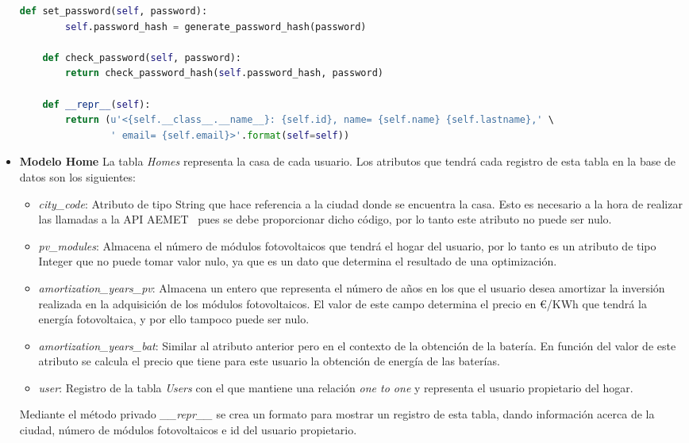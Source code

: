 \begin{itemize}
\begin{lstlisting}[language=Python,float=ht,caption={Modelo \textit{User}},label={lst:modelUser}]
    def set_password(self, password):
        self.password_hash = generate_password_hash(password)

    def check_password(self, password):
        return check_password_hash(self.password_hash, password)

    def __repr__(self):
        return (u'<{self.__class__.__name__}: {self.id}, name= {self.name} {self.lastname},' \
                ' email= {self.email}>'.format(self=self))
\end{lstlisting}
\item \textbf{Modelo Home}
La tabla \textit{Homes} representa la casa de cada usuario. Los atributos que tendrá cada registro de esta tabla en la base de datos son los siguientes:
\begin{itemize}
\item \textit{city\_code}: Atributo de tipo String que hace referencia a la ciudad donde se encuentra la casa. Esto es necesario a la hora de realizar las llamadas a la API AEMET~\cite{Aemet} pues se debe proporcionar dicho código, por lo tanto este atributo no puede ser nulo.
\item \textit{pv\_modules}: Almacena el número de módulos fotovoltaicos que tendrá el hogar del usuario, por lo tanto es un atributo de tipo Integer que no puede tomar valor nulo, ya que es un dato que determina el resultado de una optimización.
\item \textit{amortization\_years\_pv}: Almacena un entero que representa el número de años en los que el usuario desea amortizar la inversión realizada en la adquisición de los módulos fotovoltaicos. El valor de este campo determina el precio en €/KWh que tendrá la energía fotovoltaica, y por ello tampoco puede ser nulo.
\item \textit{amortization\_years\_bat}: Similar al atributo anterior pero en el contexto de la obtención de la batería. En función del valor de este atributo se calcula el precio que tiene para este usuario la obtención de energía de las baterías.
\item \textit{user}: Registro de la tabla \textit{Users} con el que mantiene una relación \textit{one to one} y representa el usuario propietario del hogar.
\end{itemize}
Mediante el método privado \textit{\_\_repr\_\_} se crea un formato para mostrar un registro de esta tabla, dando información acerca de la ciudad, número de módulos fotovoltaicos e id del usuario propietario.
\end{itemize}
